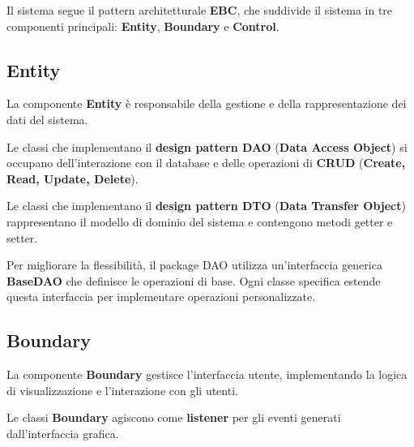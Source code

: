 Il sistema segue il pattern architetturale \textbf{EBC}, che suddivide il sistema in tre componenti principali: \textbf{Entity}, \textbf{Boundary} e \textbf{Control}.


\subsection{Entity}

La componente \textbf{Entity} è responsabile della gestione e della rappresentazione dei dati del sistema.

Le classi che implementano il \textbf{design pattern DAO} (\textbf{Data Access Object}) si occupano dell'interazione con il database e delle operazioni di \textbf{CRUD} (\textbf{Create, Read, Update, Delete}).

Le classi che implementano il \textbf{design pattern DTO} (\textbf{Data Transfer Object}) rappresentano il modello di dominio del sistema e contengono metodi getter e setter.

Per migliorare la flessibilità, il package DAO utilizza un'interfaccia generica \textbf{BaseDAO} che definisce le operazioni di base. Ogni classe specifica estende questa interfaccia per implementare operazioni personalizzate.


\subsection{Boundary}

La componente \textbf{Boundary} gestisce l'interfaccia utente, implementando la logica di visualizzazione e l'interazione con gli utenti.

Le classi \textbf{Boundary} agiscono come \textbf{listener} per gli eventi generati dall'interfaccia grafica.

